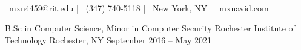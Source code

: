 \documentclass[]{awesome-cv}
\begin{document}
    
\begin{center}
	  \\
	\vspace{2mm}
	{\faEnvelope\ mxn4459@rit.edu} | {\faMobile\ (347) 740-5118} | {\faMapMarker\ New York, NY} | {\faLink\ mxnavid.com}
\end{center}
\begin{cventries}
	\cventry
	{B.Sc in Computer Science, Minor in Computer Security}
	{Rochester Institute of Technology}
	{Rochester, NY}
	{September 2016 – May 2021}
	{}
\end{cventries}
\end{document}
